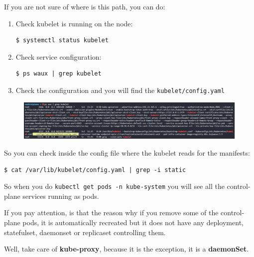\documentclass{article}
\newenvironment{blocktemplate}[1]{%
    \tcolorbox[beamer,%
    noparskip,breakable,
    colframe=Blue,%
    colbacklower=LimeGreen!75!LightGreen,%
    title=#1]}%
    {\endtcolorbox}
\newenvironment{blocktemplateI}[1]{%
    \tcolorbox[beamer,%
    noparskip,breakable,
    colframe=Violet,%
    colbacklower=Black,%
    title=#1]}%
    {\endtcolorbox}
\newenvironment{codetemplate}[1][]{%
  \mybasecolorbox[#1]
  \itshape
}{%
  \endmybasecolorbox
}
\begin{document}
\begin{blocktemplate}{NOTE}
If you are not sure of where is this path, you can do:
\begin{enumerate}
    \item Check kubelet is running on the node:
\begin{codetemplate}{}
\begin{verbatim}
$ systemctl status kubelet
\end{verbatim}
\end{codetemplate}

    \item Check service configuration:
\begin{codetemplate}{}
\begin{verbatim}
$ ps waux | grep kubelet
\end{verbatim}
\end{codetemplate}

    \item Check the configuration and you will find the \verb|kubelet/config.yaml|
\end{enumerate}
\begin{figure}[H]
    \includegraphics[width=\textwidth]{pictures/kubelet-config.png}
\end{figure}
\end{blocktemplate}

So you can check inside the config file where the kubelet reads for the manifests:
\begin{codetemplate}{}
\begin{verbatim}
$ cat /var/lib/kubelet/config.yaml | grep -i static
\end{verbatim}
\end{codetemplate}

So when you do \verb|kubectl get pods -n kube-system| you will see all the control-plane services running as pods.

\begin{blocktemplateI}{NOTE}
If you pay attention, is that the reason why if you remove some of the control-plane pods, it is automatically recreated but it does not have any deployment, statefulset, daemonset or replicaset controlling them.

Well, take care of \textbf{kube-proxy}, because it is the exception, it is a \textbf{daemonSet}.
\end{blocktemplateI}
\end{document}
